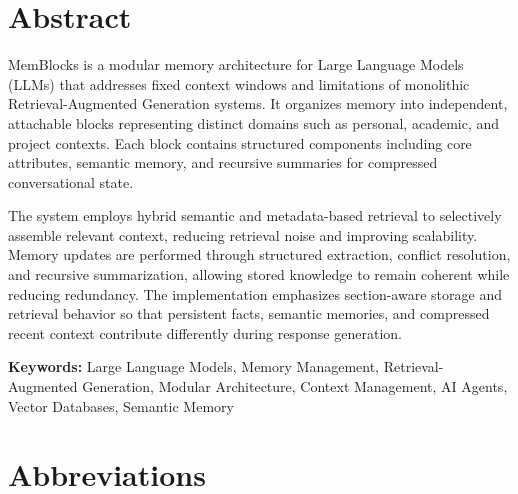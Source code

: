 \documentclass[12pt,a4paper]{article}
\begin{document}
\section*{Abstract}
MemBlocks is a modular memory architecture for Large Language Models (LLMs) that addresses fixed context windows and limitations of monolithic Retrieval-Augmented Generation systems. It organizes memory into independent, attachable blocks representing distinct domains such as personal, academic, and project contexts. Each block contains structured components including core attributes, semantic memory, and recursive summaries for compressed conversational state.

The system employs hybrid semantic and metadata-based retrieval to selectively assemble relevant context, reducing retrieval noise and improving scalability. Memory updates are performed through structured extraction, conflict resolution, and recursive summarization, allowing stored knowledge to remain coherent while reducing redundancy. The implementation emphasizes section-aware storage and retrieval behavior so that persistent facts, semantic memories, and compressed recent context contribute differently during response generation.

\textbf{Keywords:} Large Language Models, Memory Management, Retrieval-Augmented Generation, Modular Architecture, Context Management, AI Agents, Vector Databases, Semantic Memory

\clearpage



\tableofcontents

\listoffigures
\clearpage


\section*{Abbreviations}
\end{document}
